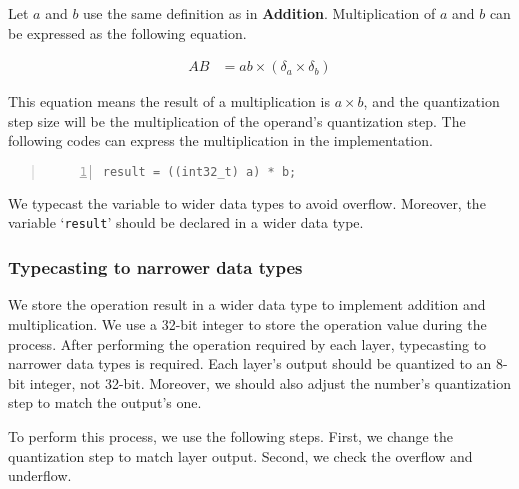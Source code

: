 Let $a$ and $b$ use the same definition as in \textbf{Addition}. Multiplication of $a$ and $b$ can be expressed as the following equation.

\begin{align*}
  AB &= a b\times (\delta_a \times \delta_b)
\end{align*}

This equation means the result of a multiplication is $a\times b$, and the quantization step size will be the multiplication of the operand's quantization step. The following codes can express the multiplication in the implementation.

\begin{quote}
  \begin{lstlisting}[language=C, numbers=left, frame=l]
result = ((int32_t) a) * b;
  \end{lstlisting}
\end{quote}


We typecast the variable to wider data types to avoid overflow. Moreover, the variable `\texttt{result}' should be declared in a wider data type.

\subsubsection{Typecasting to narrower data types}

We store the operation result in a wider data type to implement addition and multiplication. We use a 32-bit integer to store the operation value during the process. After performing the operation required by each layer, typecasting to narrower data types is required. Each layer's output should be quantized to an 8-bit integer, not 32-bit. Moreover, we should also adjust the number's quantization step to match the output's one.



%   

To perform this process, we use the following steps. First, we change the quantization step to match layer output. Second, we check the overflow and underflow.

